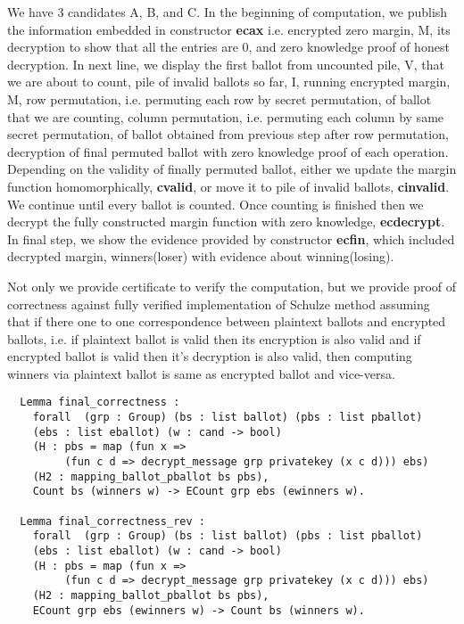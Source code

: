 \documentclass{llncs}
\begin{document}
We have 3 candidates A, B, and C. In the beginning of computation, we publish 
the information embedded in constructor \textbf{ecax} i.e.  
encrypted zero margin, M, its decryption to show that all the 
entries are 0, and zero knowledge proof of honest decryption. 
In next line, we display the 
first ballot from uncounted pile, V, that we are about to count, 
pile of invalid ballots so far, I, 
running encrypted margin, M, row permutation, i.e. permuting each row by secret
 permutation, of ballot that we are counting, 
column permutation, i.e. permuting each column by same secret permutation, 
 of ballot obtained from previous step after row permutation,
decryption of final permuted ballot with zero knowledge proof of each operation. 
Depending on the validity of finally permuted ballot, either we update the 
margin function homomorphically, \textbf{cvalid}, 
or move it to pile of invalid ballots, \textbf{cinvalid}. We continue 
until every ballot is counted. Once counting is finished then we decrypt the fully 
constructed margin function with zero knowledge, \textbf{ecdecrypt}. 
In final step, we show the evidence provided by 
constructor \textbf{ecfin}, which included decrypted margin, winners(loser) with
evidence about winning(losing).


Not only we provide certificate to verify the computation, but we provide 
proof of correctness against fully verified implementation of 
Schulze method \cite{Pattinson:2017:SVE} assuming 
that if there one to one correspondence between plaintext ballots and encrypted ballots,
i.e. if plaintext ballot is valid then its encryption is also valid and if 
encrypted ballot is valid then it's decryption is also valid, 
then computing winners via plaintext ballot is same as encrypted ballot and vice-versa. 
\begin{verbatim}
  Lemma final_correctness :
    forall  (grp : Group) (bs : list ballot) (pbs : list pballot) 
    (ebs : list eballot) (w : cand -> bool)
    (H : pbs = map (fun x => 
         (fun c d => decrypt_message grp privatekey (x c d))) ebs)
    (H2 : mapping_ballot_pballot bs pbs), 
    Count bs (winners w) -> ECount grp ebs (ewinners w).
      
  Lemma final_correctness_rev :
    forall  (grp : Group) (bs : list ballot) (pbs : list pballot) 
    (ebs : list eballot) (w : cand -> bool)
    (H : pbs = map (fun x => 
         (fun c d => decrypt_message grp privatekey (x c d))) ebs)
    (H2 : mapping_ballot_pballot bs pbs),
    ECount grp ebs (ewinners w) -> Count bs (winners w).
\end{verbatim}
\end{document}
